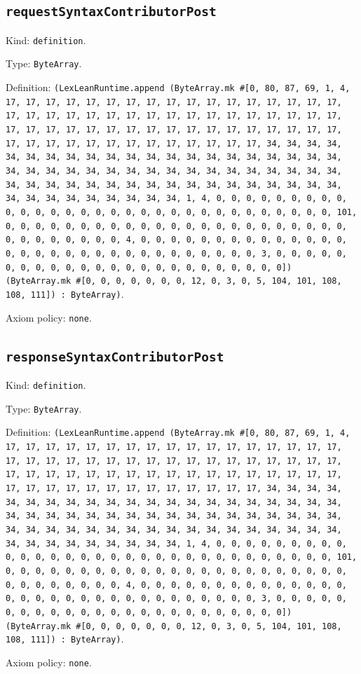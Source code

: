 \documentclass[11pt]{article}
\begin{document}
\subsection*{\texttt{requestSyntaxContributorPost}}
\noindent Kind: \texttt{definition}.\par
\noindent Type: \texttt{ByteArray}.\par
\noindent Definition: \texttt{(LexLeanRuntime.append (ByteArray.mk \#[0, 80, 87, 69, 1, 4, 17, 17, 17, 17, 17, 17, 17, 17, 17, 17, 17, 17, 17, 17, 17, 17, 17, 17, 17, 17, 17, 17, 17, 17, 17, 17, 17, 17, 17, 17, 17, 17, 17, 17, 17, 17, 17, 17, 17, 17, 17, 17, 17, 17, 17, 17, 17, 17, 17, 17, 17, 17, 17, 17, 17, 17, 17, 17, 17, 17, 17, 17, 17, 17, 34, 34, 34, 34, 34, 34, 34, 34, 34, 34, 34, 34, 34, 34, 34, 34, 34, 34, 34, 34, 34, 34, 34, 34, 34, 34, 34, 34, 34, 34, 34, 34, 34, 34, 34, 34, 34, 34, 34, 34, 34, 34, 34, 34, 34, 34, 34, 34, 34, 34, 34, 34, 34, 34, 34, 34, 34, 34, 34, 34, 34, 34, 34, 34, 1, 4, 0, 0, 0, 0, 0, 0, 0, 0, 0, 0, 0, 0, 0, 0, 0, 0, 0, 0, 0, 0, 0, 0, 0, 0, 0, 0, 0, 0, 0, 0, 0, 101, 0, 0, 0, 0, 0, 0, 0, 0, 0, 0, 0, 0, 0, 0, 0, 0, 0, 0, 0, 0, 0, 0, 0, 0, 0, 0, 0, 0, 0, 0, 0, 4, 0, 0, 0, 0, 0, 0, 0, 0, 0, 0, 0, 0, 0, 0, 0, 0, 0, 0, 0, 0, 0, 0, 0, 0, 0, 0, 0, 0, 0, 0, 0, 3, 0, 0, 0, 0, 0, 0, 0, 0, 0, 0, 0, 0, 0, 0, 0, 0, 0, 0, 0, 0, 0, 0, 0, 0]) (ByteArray.mk \#[0, 0, 0, 0, 0, 0, 0, 12, 0, 3, 0, 5, 104, 101, 108, 108, 111]) : ByteArray)}.\par
\noindent Axiom policy: \texttt{none}.\par
\subsection*{\texttt{responseSyntaxContributorPost}}
\noindent Kind: \texttt{definition}.\par
\noindent Type: \texttt{ByteArray}.\par
\noindent Definition: \texttt{(LexLeanRuntime.append (ByteArray.mk \#[0, 80, 87, 69, 1, 4, 17, 17, 17, 17, 17, 17, 17, 17, 17, 17, 17, 17, 17, 17, 17, 17, 17, 17, 17, 17, 17, 17, 17, 17, 17, 17, 17, 17, 17, 17, 17, 17, 17, 17, 17, 17, 17, 17, 17, 17, 17, 17, 17, 17, 17, 17, 17, 17, 17, 17, 17, 17, 17, 17, 17, 17, 17, 17, 17, 17, 17, 17, 17, 17, 34, 34, 34, 34, 34, 34, 34, 34, 34, 34, 34, 34, 34, 34, 34, 34, 34, 34, 34, 34, 34, 34, 34, 34, 34, 34, 34, 34, 34, 34, 34, 34, 34, 34, 34, 34, 34, 34, 34, 34, 34, 34, 34, 34, 34, 34, 34, 34, 34, 34, 34, 34, 34, 34, 34, 34, 34, 34, 34, 34, 34, 34, 34, 34, 1, 4, 0, 0, 0, 0, 0, 0, 0, 0, 0, 0, 0, 0, 0, 0, 0, 0, 0, 0, 0, 0, 0, 0, 0, 0, 0, 0, 0, 0, 0, 0, 0, 101, 0, 0, 0, 0, 0, 0, 0, 0, 0, 0, 0, 0, 0, 0, 0, 0, 0, 0, 0, 0, 0, 0, 0, 0, 0, 0, 0, 0, 0, 0, 0, 4, 0, 0, 0, 0, 0, 0, 0, 0, 0, 0, 0, 0, 0, 0, 0, 0, 0, 0, 0, 0, 0, 0, 0, 0, 0, 0, 0, 0, 0, 0, 0, 3, 0, 0, 0, 0, 0, 0, 0, 0, 0, 0, 0, 0, 0, 0, 0, 0, 0, 0, 0, 0, 0, 0, 0, 0]) (ByteArray.mk \#[0, 0, 0, 0, 0, 0, 0, 12, 0, 3, 0, 5, 104, 101, 108, 108, 111]) : ByteArray)}.\par
\noindent Axiom policy: \texttt{none}.\par
\end{document}

